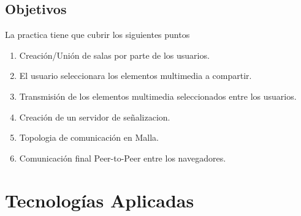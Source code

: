 \subsection{Objetivos}
La practica tiene que cubrir los siguientes puntos
\begin{enumerate}
\item Creación/Unión de salas por parte de los usuarios.
\item El usuario seleccionara los elementos multimedia a compartir.
\item Transmisión de los elementos multimedia seleccionados entre los usuarios.
\item Creación de un servidor de señalizacion.
\item Topologia de comunicación en Malla.
\item Comunicación final Peer-to-Peer entre los navegadores.
\end{enumerate}
\section{Tecnologías Aplicadas}

